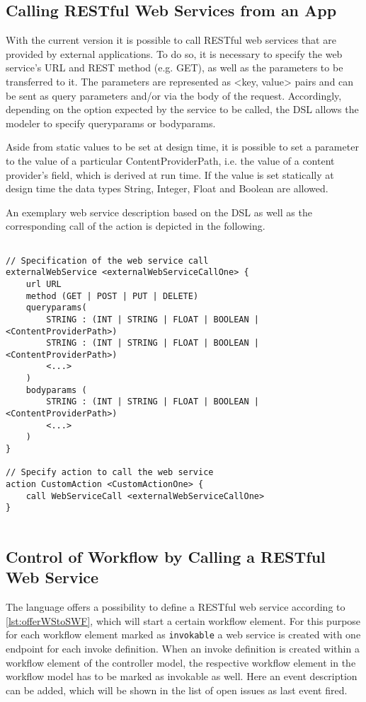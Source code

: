 
\subsection{Calling RESTful Web Services from an App}
\label{subsec: CallingWebServices}
With the current \MD version it is possible to call RESTful web services that are provided by external applications. To do so, it is necessary to specify the web service's URL and REST method (e.g. GET), as well as the parameters to be transferred to it. The parameters are represented as <key, value> pairs and can be sent as query parameters and/or via the body of the request. Accordingly, depending on the option expected by the service to be called, the DSL allows the modeler to specify queryparams or bodyparams. 

Aside from static values to be set at design time, it is possible to set a parameter to the value of a particular ContentProviderPath, i.e. the value of a content provider's field, which is derived at run time. If the value is set statically at design time the data types String, Integer, Float and Boolean are allowed. 

An exemplary web service description based on the DSL as well as the corresponding call of the action is depicted in the following.

\begin{lstlisting}[language=MD2, label=lst:callWSfromWF, caption=Calling a Web Service From Within a Workflow]

// Specification of the web service call
externalWebService <externalWebServiceCallOne> {
	url URL
	method (GET | POST | PUT | DELETE)
	queryparams(
		STRING : (INT | STRING | FLOAT | BOOLEAN | <ContentProviderPath>)	
		STRING : (INT | STRING | FLOAT | BOOLEAN | <ContentProviderPath>)
		<...>	
	)
	bodyparams (
		STRING : (INT | STRING | FLOAT | BOOLEAN | <ContentProviderPath>)
		<...>
	)
}

// Specify action to call the web service
action CustomAction <CustomActionOne> {
	call WebServiceCall <externalWebServiceCallOne>
}
	
\end{lstlisting}





\subsection{Control of Workflow by Calling a RESTful Web Service}
\label{subsec: WorkflowControlThroughWS}
The \MD language offers a possibility to define a RESTful web service according to \cref{lst:offerWStoSWF}, which will start a certain workflow element. For this purpose for each workflow element marked as \lstinline|invokable| a web service is created with one endpoint for each invoke definition. 
When an invoke definition is created within a workflow element of the controller model, the respective workflow element in the workflow model has to be marked as invokable as well. Here an event description can be added, which will be shown in the list of open issues as last event fired.

